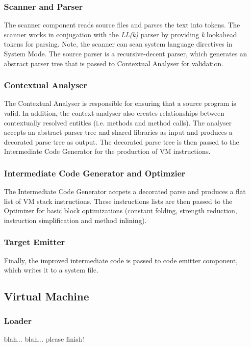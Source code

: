 \documentclass[12pt]{article}
\begin{document}
\subsubsection{Scanner and Parser}
The scanner component reads source files and parses the text into tokens.  The scanner works in conjugation with the \emph{LL(k)} parser by providing \emph{k} lookahead tokens for parsing.  Note, the scanner can scan system language directives in System Mode.  The source parser is a recursive-decent parser, which generates an abstract parser tree that is passed to Contextual Analyser for validation.

\subsubsection{Contextual Analyser}
The Contextual Analyser is responsible for ensuring that a source program is valid.  In addition, the context analyser also creates relationships between contextually resolved entitles (i.e. methods and method calls).  The analyser accepts an abstract parser tree and shared libraries as input and produces a decorated parse tree as output.  The decorated parse tree is then passed to the Intermediate Code Generator for the production of VM instructions.

\subsubsection{Intermediate Code Generator and Optimzier}
The Intermediate Code Generator accpets a decorated parse and produces a flat list of VM stack instructions.  These instructions lists are then passed to the Optimizer for basic block optimizations (constant folding, strength reduction, instruction simplification and method inlining).

\subsubsection{Target Emitter}
Finally, the improved intermediate code is passed to code emitter component, which writes it to a system file.

\subsection{Virtual Machine}

\subsubsection{Loader}
blah... blah... please finish!
\end{document}
